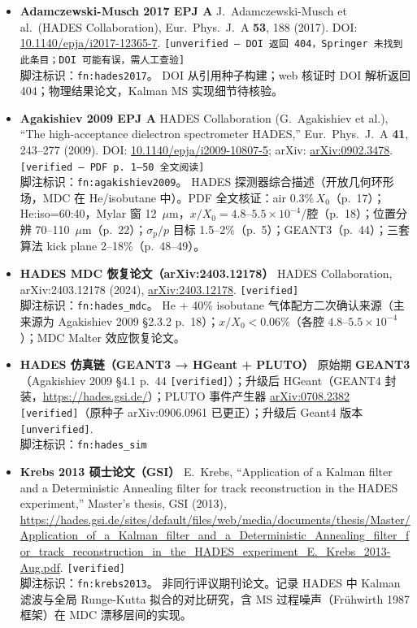 \documentclass[a4paper, 11pt]{article}
\begin{document}
\begin{itemize}[leftmargin=2em,itemsep=3pt]

\item \textbf{Adamczewski-Musch 2017 EPJ A} \quad
J.~Adamczewski-Musch et al.\ (HADES Collaboration),
Eur.\ Phys.\ J.\ A \textbf{53}, 188 (2017).
DOI: \href{https://doi.org/10.1140/epja/i2017-12365-7}{10.1140/epja/i2017-12365-7}.
\texttt{[unverified --- DOI 返回 404，Springer 未找到此条目；DOI 可能有误，需人工查验]}
\\
脚注标识：\texttt{fn:hades2017}。
DOI 从引用种子构建；web 核证时 DOI 解析返回 404；物理结果论文，Kalman MS 实现细节待核验。

\item \textbf{Agakishiev 2009 EPJ A} \quad
HADES Collaboration (G.~Agakishiev et al.), ``The high-acceptance dielectron spectrometer HADES,''
Eur.\ Phys.\ J.\ A \textbf{41}, 243--277 (2009).
DOI: \href{https://doi.org/10.1140/epja/i2009-10807-5}{10.1140/epja/i2009-10807-5};
arXiv: \href{https://arxiv.org/abs/0902.3478}{arXiv:0902.3478}.
\texttt{[verified --- PDF p.~1--50 全文阅读]}
\\
脚注标识：\texttt{fn:agakishiev2009}。
HADES 探测器综合描述（开放几何环形场，MDC 在 He/isobutane 中）。PDF 全文核证：air $0.3\%\,X_0$（p.~17）；He:iso=60:40，Mylar 窗 12~$\mu$m，$x/X_0 = 4.8$--$5.5\times10^{-4}$/腔（p.~18）；位置分辨 70--110~$\mu$m（p.~22）；$\sigma_p/p$ 目标 1.5--2\%（p.~5）；GEANT3（p.~44）；三套算法 kick plane 2--18\%（p.~48--49）。

\item \textbf{HADES MDC 恢复论文（arXiv:2403.12178）} \quad
HADES Collaboration, arXiv:2403.12178 (2024), \href{https://arxiv.org/abs/2403.12178}{arXiv:2403.12178}. \texttt{[verified]}
\\
脚注标识：\texttt{fn:hades\_mdc}。
He + 40\% isobutane 气体配方二次确认来源（主来源为 Agakishiev 2009 §2.3.2 p.~18）；$x/X_0 < 0.06$\%（各腔 $4.8$--$5.5\times10^{-4}$）；MDC Malter 效应恢复论文。

\item \textbf{HADES 仿真链（GEANT3 → HGeant + PLUTO）} \quad
原始期 \textbf{GEANT3}（Agakishiev 2009 §4.1 p.~44 \texttt{[verified]}）；升级后 HGeant（GEANT4 封装，\url{https://hades.gsi.de/}）；PLUTO 事件产生器 \href{https://arxiv.org/abs/0708.2382}{arXiv:0708.2382} \texttt{[verified]}（原种子 arXiv:0906.0961 已更正）；升级后 Geant4 版本 \texttt{[unverified]}.
\\
脚注标识：\texttt{fn:hades\_sim}

\item \textbf{Krebs 2013 硕士论文（GSI）} \quad
E.~Krebs, ``Application of a Kalman filter and a Deterministic Annealing filter for track reconstruction in the HADES experiment,''
Master's thesis, GSI (2013),
\url{https://hades.gsi.de/sites/default/files/web/media/documents/thesis/Master/Application_of_a_Kalman_filter_and_a_Deterministic_Annealing_filter_for_track_reconstruction_in_the_HADES_experiment_E._Krebs_2013-Aug.pdf}.
\texttt{[verified]}
\\
脚注标识：\texttt{fn:krebs2013}。
非同行评议期刊论文。记录 HADES 中 Kalman 滤波与全局 Runge-Kutta 拟合的对比研究，含 MS 过程噪声（Frühwirth 1987 框架）在 MDC 漂移层间的实现。


\end{itemize}
\end{document}
